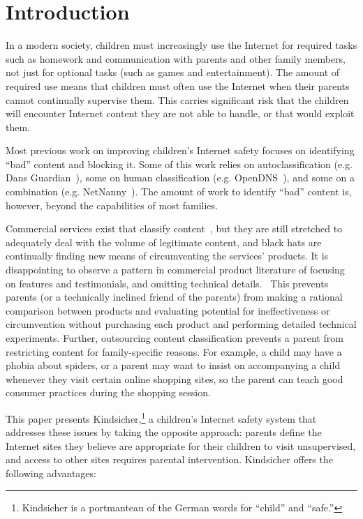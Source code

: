 

\vspace{20mm}

\section{Introduction}
\nopagebreak
In a modern society, children must increasingly use the Internet for required
tasks such as homework and communication with parents and other family
members, not just for optional tasks (such as games and entertainment).
%
The amount of required use means that children must often use the Internet
when their parents cannot continually supervise them.
%
This carries significant risk that the children will encounter Internet
content they are not able to handle, or that would exploit them.

Most previous work on improving children's Internet safety focuses on
identifying ``bad'' content and blocking it. Some of this work relies
on autoclassification (e.g. Dans Guardian~\cite{dansguardian}), some on
human classification (e.g. OpenDNS~\cite{opendns}), and some on a
combination (e.g. NetNanny~\cite{netnanny}).
%
The amount of work to identify ``bad'' content is, however, beyond the
capabilities of most families.

Commercial services exist that classify content~\cite{opendns, netnanny,
mcafee,k9}, but they are still stretched to adequately deal with the volume of
legitimate content, and black hats are continually finding new means of
circumventing the services' products.
%
It is disappointing to observe a pattern in commercial product literature of
focusing on features and testimonials, and omitting technical
details.~\cite{opendns, kidlogger, mcafee, k9}
%
This prevents parents (or a technically inclined friend of the parents) from
making a rational comparison between products and evaluating potential for
ineffectiveness or circumvention without purchasing each product and
performing detailed technical experiments.
%
Further, outsourcing content classification prevents a parent from restricting
content for family-specific reasons.
%
For example, a child may have a phobia about spiders, or a parent may want to
insist on accompanying a child whenever they visit certain online shopping
sites, so the parent can teach good consumer practices during the shopping
session.

This paper presents Kindsicher,\footnote{Kindsicher is a portmanteau of the
German words for ``child'' and ``safe.''} a children's Internet safety system
that addresses these issues by taking the opposite approach: 
%
parents define the Internet sites they believe are appropriate for their
children to visit unsupervised, and access to other sites requires parental
intervention.
%
Kindsicher offers the following advantages:

